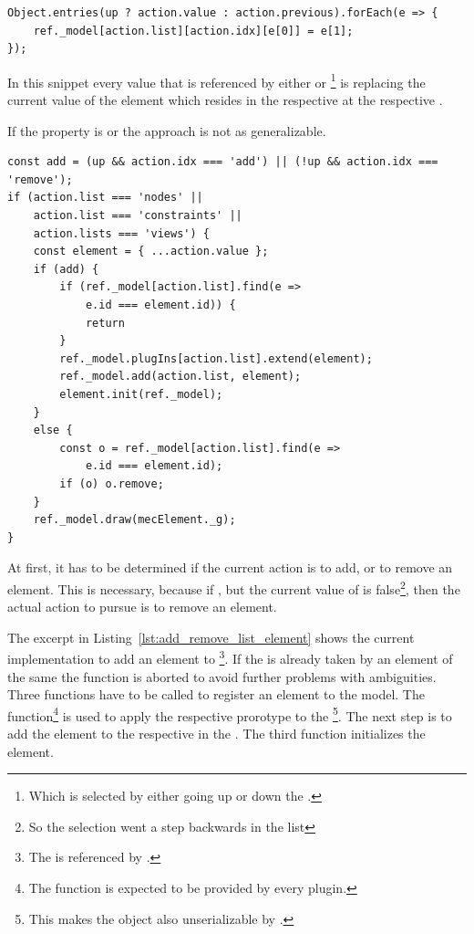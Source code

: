 \begin{lstlisting}[label={lst:update_list_element}, caption={Updating an element in one of \code{mecElement} arrays.}]
Object.entries(up ? action.value : action.previous).forEach(e => {
    ref._model[action.list][action.idx][e[0]] = e[1];
});
\end{lstlisting}

In this snippet every value that is referenced by either  or \footnote{Which is selected by either going up or down the .} is replacing the current value of the element which resides in the respective  at the respective .

If the  property is  or  the approach is not as generalizable.

\begin{lstlisting}[label={lst:add_remove_list_element}, caption={Adding or removing an element in \code{mecElement}.}]
const add = (up && action.idx === 'add') || (!up && action.idx === 'remove');
if (action.list === 'nodes' ||
    action.list === 'constraints' ||
    action.lists === 'views') {
    const element = { ...action.value };
    if (add) {
        if (ref._model[action.list].find(e =>
            e.id === element.id)) {
            return
        }
        ref._model.plugIns[action.list].extend(element);
        ref._model.add(action.list, element);
        element.init(ref._model);
    }
    else {
        const o = ref._model[action.list].find(e =>
            e.id === element.id);
        if (o) o.remove;
    }
    ref._model.draw(mecElement._g);
}
\end{lstlisting}

At first, it has to be determined if the current action is to add, or to remove an element.
This is necessary, because if , but the current value of  is false\footnote{So the selection went a step backwards in the list}, then the actual action to pursue is to remove an element.

The excerpt in Listing~\ref{lst:add_remove_list_element} shows the current implementation to add an element to \footnote{The  is referenced by .}.
If the  is already taken by an element of the same  the function is aborted to avoid further problems with ambiguities.
Three functions have to be called to register an element to the  model.
The  function\footnote{The  function is expected to be provided by every  plugin.} is used to apply the respective prorotype to the \footnote{This makes the object also unserializable by .}.
The next step is to add the element to the respective  in the .
The third function initializes the element. %

